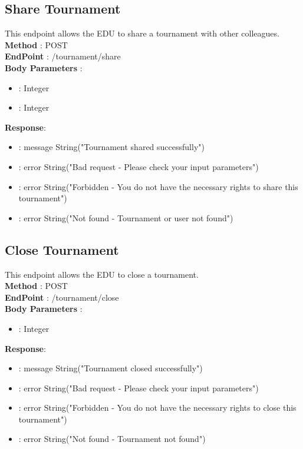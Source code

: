 \subsection*{Share Tournament}
This endpoint allows the EDU to share a tournament with other colleagues.\\
\textbf{Method} : POST \\
\textbf{EndPoint} : /tournament/share \\
\textbf{Body Parameters} :
\begin{itemize}
    \item {} : Integer
    \item {} : Integer
\end{itemize}
\textbf{Response}:
\begin{itemize}
    \item {} : message String("Tournament shared successfully")
    \item {} : error String("Bad request - Please check your input parameters")
    \item {} : error String("Forbidden - You do not have the necessary rights to share this tournament")
    \item {} : error String("Not found - Tournament or user not found")
\end{itemize}

\subsection*{Close Tournament}
This endpoint allows the EDU to close a tournament.\\
\textbf{Method} : POST \\
\textbf{EndPoint} : /tournament/close \\
\textbf{Body Parameters} :
\begin{itemize}
\item {} : Integer
\end{itemize}
\textbf{Response}:
\begin{itemize}
    \item {} : message String("Tournament closed successfully")
    \item {} : error String("Bad request - Please check your input parameters")
    \item {} : error String("Forbidden - You do not have the necessary rights to close this tournament")
    \item {} : error String("Not found - Tournament not found")
\end{itemize}

